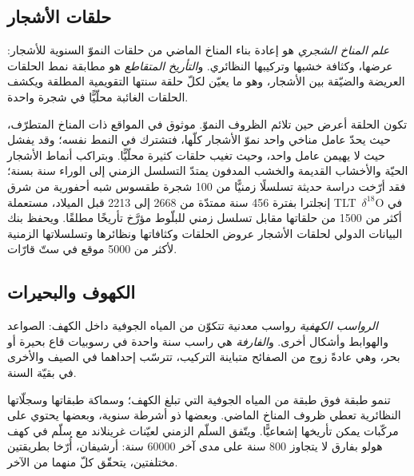 \subsection*{حلقات الأشجار}

\begin{definition}\label{def:b2:climate-proxies:dendro}
\emph{علم المناخ الشجري} هو إعادة بناء المناخ الماضي من
حلقات النموّ السنوية للأشجار: عرضها، وكثافة خشبها وتركيبها
النظائري. و\emph{التأريخ المتقاطع} هو مطابقة نمط الحلقات العريضة
والضيّقة بين الأشجار، وهو ما يعيّن لكلّ حلقة سنتها التقويمية المطلقة ويكشف
الحلقات الغائبة محلّيًّا في شجرة واحدة.
\end{definition}

تكون الحلقة أعرض حين تلائم الظروف النموّ.  موثوق في المواقع ذات المناخ المتطرّف، حيث يحدّ
عامل مناخي واحد نموّ الأشجار كلّها، فتشترك في النمط نفسه؛ وقد
يفشل حيث لا يهيمن عامل واحد، وحيث تغيب حلقات كثيرة محلّيًّا.
وبتراكب أنماط الأشجار الحيّة والأخشاب القديمة والخشب المدفون يمتدّ التسلسل الزمني إلى الوراء
سنة بسنة؛ فقد أرّخت دراسة حديثة تسلسلًا زمنيًّا من 100 شجرة طقسوس شبه أحفورية من شرق إنجلترا بفترة
456 سنة ممتدّة من 2668 إلى 2213 قبل الميلاد، مستعملة \mbox{\textdir TLT $\delta^{18}$O} في أكثر من \num{1500} من حلقاتها
مقابل تسلسل زمني للبلّوط مؤرَّخ تأريخًا مطلقًا. ويحفظ بنك البيانات الدولي لحلقات الأشجار عروض
الحلقات وكثافاتها ونظائرها وتسلسلاتها الزمنية لأكثر من \num{5000} موقع في ستّ قارّات.

\subsection*{الكهوف والبحيرات}

\begin{definition}\label{def:b2:climate-proxies:archives}
\emph{الرواسب الكهفية} رواسب معدنية تتكوّن من المياه الجوفية داخل
الكهف: الصواعد والهوابط وأشكال أخرى. و\emph{الفارفة} هي
راسب سنة واحدة في رسوبيات قاع بحيرة أو بحر، وهي عادةً زوج من الصفائح متباينة
التركيب، تترسّب إحداهما في الصيف والأخرى في بقيّة السنة.
\end{definition}

تنمو  طبقة فوق طبقة من المياه الجوفية التي تبلغ الكهف؛ وسماكة
طبقاتها وسجلّاتها النظائرية تعطي ظروف المناخ الماضي. وبعضها ذو أشرطة سنوية،
وبعضها يحتوي على مركّبات يمكن تأريخها إشعاعيًّا. ويتّفق السلّم الزمني لعيّنات غرينلاند مع سلّم
 في كهف هولو بفارق لا يتجاوز 800 سنة على مدى آخر \num{60000} سنة: أرشيفان،
أُرّخا بطريقتين مختلفتين، يتحقّق كلّ منهما من الآخر.

